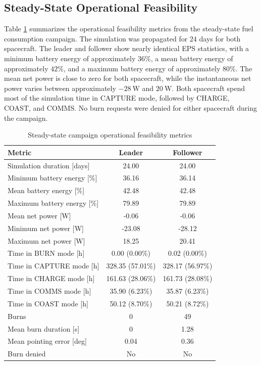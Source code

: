 \subsection{Steady-State Operational Feasibility}


Table \ref{tab:steady_state_feasibility_summary} summarizes the operational feasibility metrics from the steady-state fuel consumption campaign. The simulation was propagated for $24$ days for both spacecraft. The leader and follower show nearly identical EPS statistics, with a minimum battery energy of approximately $36\%$, a mean battery energy of approximately $42\%$, and a maximum battery energy of approximately $80\%$. The mean net power is close to zero for both spacecraft, while the instantaneous net power varies between approximately $-28~\mathrm{W}$ and $20~\mathrm{W}$. Both spacecraft spend most of the simulation time in CAPTURE mode, followed by CHARGE, COAST, and COMMS. No burn requests were denied for either spacecraft during the campaign.

\begin{table}[H]
\centering
\caption{Steady-state campaign operational feasibility metrics}
\label{tab:steady_state_feasibility_summary}
\begin{tabular}{lcc}
\toprule
\textbf{Metric} & \textbf{Leader} & \textbf{Follower} \\
\midrule

Simulation duration [days] & 24.00 & 24.00 \\
Minimum battery energy [\%] & 36.16 & 36.14 \\
Mean battery energy [\%] & 42.48 & 42.48 \\
Maximum battery energy [\%] & 79.89 & 79.89 \\
Mean net power [W] & -0.06 & -0.06 \\
Minimum net power [W] & -23.08 & -28.12 \\
Maximum net power [W] & 18.25 & 20.41 \\
Time in BURN mode [h] & 0.00 (0.00\%) & 0.02 (0.00\%) \\
Time in CAPTURE mode [h] & 328.35 (57.01\%) & 328.17 (56.97\%) \\
Time in CHARGE mode [h] & 161.63 (28.06\%) & 161.73 (28.08\%) \\
Time in COMMS mode [h] & 35.90 (6.23\%) & 35.87 (6.23\%) \\
Time in COAST mode [h] & 50.12 (8.70\%) & 50.21 (8.72\%) \\
Burns & 0 & 49 \\
Mean burn duration [s] & 0 & 1.28 \\
Mean pointing error [deg] & 0.04 & 0.36 \\
Burn denied & No & No \\
\bottomrule
\end{tabular}
\end{table}

